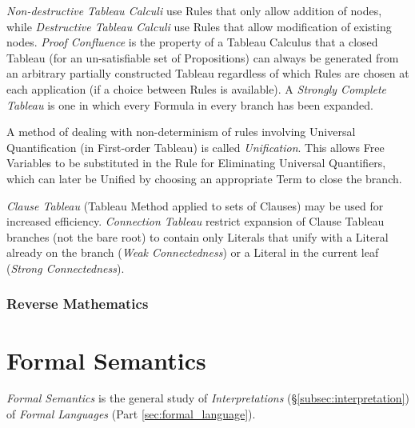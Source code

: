 \documentclass{article}
\begin{document}
\emph{Non-destructive Tableau Calculi} use Rules that only allow
addition of nodes, while \emph{Destructive Tableau Calculi} use Rules
that allow modification of existing nodes. \emph{Proof Confluence} is
the property of a Tableau Calculus that a closed Tableau (for an
un-satisfiable set of Propositions) can always be generated from an
arbitrary partially constructed Tableau regardless of which Rules are
chosen at each application (if a choice between Rules is available). A
\emph{Strongly Complete Tableau} is one in which every Formula in
every branch has been expanded.

A method of dealing with non-determinism of rules involving Universal
Quantification (in First-order Tableau) is called
\emph{Unification}. This allows Free Variables to be substituted in
the Rule for Eliminating Universal Quantifiers, which can later be
Unified by choosing an appropriate Term to close the branch.

\emph{Clause Tableau} (Tableau Method applied to sets of Clauses) may
be used for increased efficiency. \emph{Connection Tableau} restrict
expansion of Clause Tableau branches (not the bare root) to contain
only Literals that unify with a Literal already on the branch
(\emph{Weak Connectedness}) or a Literal in the current leaf
(\emph{Strong Connectedness}).



\section{Reverse Mathematics} \label{sec:reverse_mathematics}



\part{Formal Semantics}

\emph{Formal Semantics} is the general study of \emph{Interpretations}
(\S\ref{subsec:interpretation}) of \emph{Formal Languages} (Part
\ref{sec:formal_language}).
\end{document}
